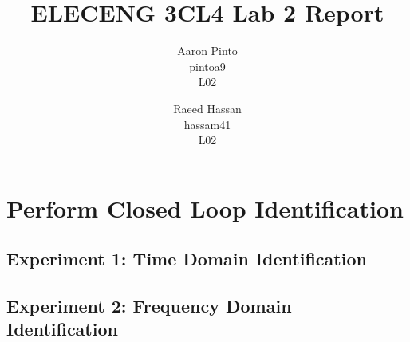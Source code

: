 \documentclass[12pt]{article}
\title{ELECENG 3CL4 Lab 2 Report}
\author{
    Aaron Pinto \\
    pintoa9 \\
    L02
    \and
    Raeed Hassan \\
    hassam41 \\
    L02
}
\begin{document}
\maketitle
\clearpage

\setcounter{section}{2}
\section{Perform Closed Loop Identification}

\subsection{Experiment 1: Time Domain Identification}

\subsection{Experiment 2: Frequency Domain Identification}
\end{document}
